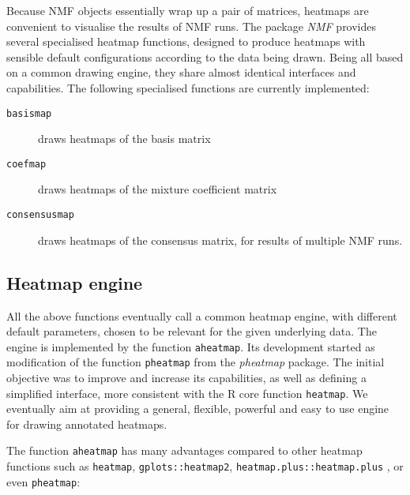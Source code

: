 \documentclass[a4paper]{article}\usepackage{graphicx, color}
\let\code=\texttt
\newcommand{\pkgname}[1]{\textit{#1}\xspace}
\newcommand{\nmfpack}{\pkgname{NMF}}
\begin{document}
Because NMF objects essentially wrap up a pair of matrices, heatmaps are convenient 
to visualise the results of NMF runs. 
The package \nmfpack provides several specialised heatmap functions, designed to produce 
heatmaps with sensible default configurations according to the data being drawn.
Being all based on a common drawing engine, they share almost identical interfaces 
and capabilities.
The following specialised functions are currently implemented:

\begin{description}
\item[\code{basismap}] draws heatmaps of the basis matrix 
\item[\code{coefmap}] draws heatmaps of the mixture coefficient matrix
\item[\code{consensusmap}] draws heatmaps of the consensus matrix, for results 
of multiple NMF runs.
\end{description}

\subsection{Heatmap engine}

All the above functions eventually call a common heatmap engine, with 
different default parameters, chosen to be relevant for the given underlying data.
The engine is implemented by the function \code{aheatmap}. 
Its development started as modification of the function \code{pheatmap} from 
the \pkgname{pheatmap} package. 
The initial objective was to improve and increase its capabilities, as well as 
defining a simplified interface, more consistent with the R core function \code{heatmap}.
We eventually aim at providing a general, flexible, powerful and easy to use engine 
for drawing annotated heatmaps.
  
The function \code{aheatmap} has many advantages compared to other heatmap functions 
such as \code{heatmap}, \code{gplots::heatmap2}, \code{heatmap.plus::heatmap.plus} 
, or even \code{pheatmap}:
\end{document}
